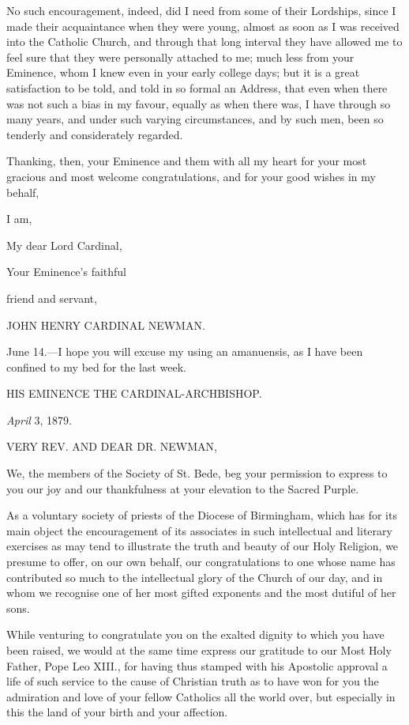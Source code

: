 No such encouragement, indeed, did I need from some of their
Lordships, since I made their acquaintance when they were young,
almost as soon as I was received into the Catholic Church, and through
that long interval they have allowed me to feel sure that they were
personally attached to me; much less from your Eminence, whom I knew
even in your early college days; but it is a great satisfaction to be
told, and told in so formal an Address, that even when there was not
such a bias in my favour, equally as when there was, I have through so
many years, and under such varying circumstances, and by such
men, been so tenderly and considerately regarded.

Thanking, then, your Eminence and them with all my heart for your
most gracious and most welcome congratulations, and for your good
wishes in my behalf,

I am,

My dear Lord Cardinal,

Your Eminence's faithful

friend and servant,

JOHN HENRY CARDINAL
NEWMAN.

June 14.—I hope you will excuse my using an amanuensis, as I have
been confined to my bed for the last week.

HIS EMINENCE THE
CARDINAL-ARCHBISHOP.


\emph{April} 3, 1879.

VERY REV. AND
DEAR DR. NEWMAN,

We, the members of the Society of St. Bede, beg your permission to
express to you our joy and our thankfulness at your elevation to the
Sacred Purple.

As a voluntary society of priests of the Diocese of Birmingham,
which has for its main object the encouragement of its associates in
such intellectual and literary exercises as may tend to illustrate the
truth and beauty of our Holy Religion, we presume to offer, on
our own behalf, our congratulations to one whose name has contributed
so much to the intellectual glory of the Church of our day, and in
whom we recognise one of her most gifted exponents and the most
dutiful of her sons.

While venturing to congratulate you on the exalted dignity to which
you have been raised, we would at the same time express our gratitude
to our Most Holy Father, Pope Leo XIII., for having thus stamped with
his Apostolic approval a life of such service to the cause of
Christian truth as to have won for you the admiration and love of your
fellow Catholics all the world over, but especially in this the land
of your birth and your affection.

